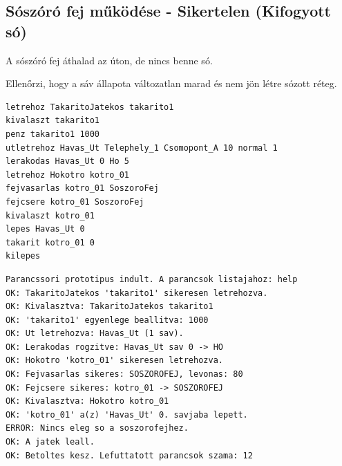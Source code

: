 \subsection{Sószóró fej működése - Sikertelen (Kifogyott só)}
\begin{test-case-description}
    A sószóró fej áthalad az úton, de nincs benne só.
\end{test-case-description}
\begin{test-case-function}
    Ellenőrzi, hogy a sáv állapota változatlan marad és nem jön létre sózott réteg.
\end{test-case-function}
\begin{test-case-input}
\begin{verbatim}
letrehoz TakaritoJatekos takarito1
kivalaszt takarito1
penz takarito1 1000
utletrehoz Havas_Ut Telephely_1 Csomopont_A 10 normal 1
lerakodas Havas_Ut 0 Ho 5
letrehoz Hokotro kotro_01
fejvasarlas kotro_01 SoszoroFej
fejcsere kotro_01 SoszoroFej
kivalaszt kotro_01
lepes Havas_Ut 0
takarit kotro_01 0
kilepes
\end{verbatim}
\end{test-case-input}
\begin{test-case-output}
\begin{verbatim}
Parancssori prototipus indult. A parancsok listajahoz: help
OK: TakaritoJatekos 'takarito1' sikeresen letrehozva.
OK: Kivalasztva: TakaritoJatekos takarito1
OK: 'takarito1' egyenlege beallitva: 1000
OK: Ut letrehozva: Havas_Ut (1 sav).
OK: Lerakodas rogzitve: Havas_Ut sav 0 -> HO
OK: Hokotro 'kotro_01' sikeresen letrehozva.
OK: Fejvasarlas sikeres: SOSZOROFEJ, levonas: 80
OK: Fejcsere sikeres: kotro_01 -> SOSZOROFEJ
OK: Kivalasztva: Hokotro kotro_01
OK: 'kotro_01' a(z) 'Havas_Ut' 0. savjaba lepett.
ERROR: Nincs eleg so a soszorofejhez.
OK: A jatek leall.
OK: Betoltes kesz. Lefuttatott parancsok szama: 12
\end{verbatim}
\end{test-case-output}

